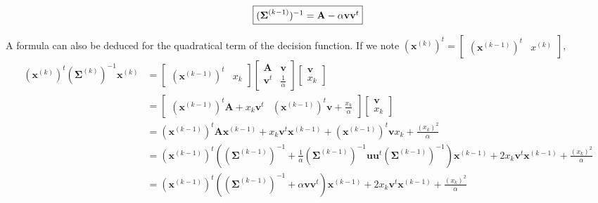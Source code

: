 \documentclass[a4paper,11pt,DIV=16]{scrartcl}
\begin{document}
        \begin{equation}
            \fbox{$(\boldsymbol{\Sigma}^{(k-1)})^{-1} = \mathbf{A} - \alpha \mathbf{v} \mathbf{v}^t$}
        \end{equation}

        A formula can also be deduced for the quadratical term of the decision function. If we note $(\mathbf{x}^{(k)})^t = \left[\begin{array}{cc} (\mathbf{x}^{(k-1)})^t   & x^(k) \end{array}\right]$,
        \begin{align*}
            (\mathbf{x}^{(k)})^t (\boldsymbol{\Sigma}^{(k)})^{-1} \mathbf{x}^{(k)}
            &= \left[\begin{array}{cc} (\mathbf{x}^{(k-1)})^t   & x_k \end{array}\right]
            \left[\begin{array}{cc}
            \mathbf{A}   & \mathbf{v} \\
            \mathbf{v}^t & \frac{1}{\alpha}
            \end{array}\right]
            \left[\begin{array}{c} \mathbf{v} \\ x_k \end{array}\right] \\
            &= \left[\begin{array}{cc} (\mathbf{x}^{(k-1)})^t \mathbf{A} + x_k \mathbf{v}^t & (\mathbf{x}^{(k-1)})^t \mathbf{v} + \frac{x_k}{\alpha} \end{array}\right]
            \left[\begin{array}{c} \mathbf{v} \\ x_k \end{array}\right] \\
            &= (\mathbf{x}^{(k-1)})^t \mathbf{A} \mathbf{x}^{(k-1)} + x_k \mathbf{v}^t \mathbf{x}^{(k-1)} + (\mathbf{x}^{(k-1)})^t \mathbf{v} x_k + \frac{(x_k)^2}{\alpha} \\
            &= (\mathbf{x}^{(k-1)})^t ((\boldsymbol{\Sigma}^{(k-1)})^{-1} + \frac{1}{\alpha} (\boldsymbol{\Sigma}^{(k-1)})^{-1} \mathbf{u} \mathbf{u}^t (\boldsymbol{\Sigma}^{(k-1)})^{-1}) \mathbf{x}^{(k-1)}
               + 2 x_k \mathbf{v}^t \mathbf{x}^{(k-1)} + \frac{(x_k)^2}{\alpha} \\
            &= (\mathbf{x}^{(k-1)})^t ((\boldsymbol{\Sigma}^{(k-1)})^{-1} + \alpha \mathbf{v} \mathbf{v}^t) \mathbf{x}^{(k-1)}
               + 2 x_k \mathbf{v}^t \mathbf{x}^{(k-1)} + \frac{(x_k)^2}{\alpha} \\

\end{align*}
\end{document}
